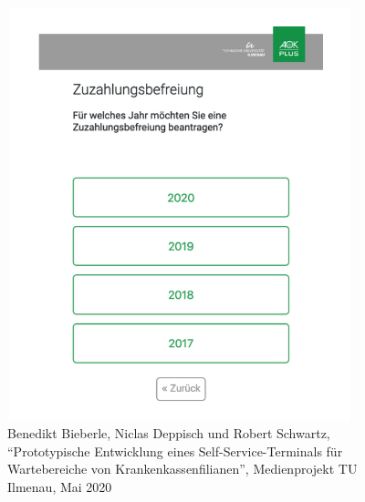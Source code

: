 \begin{figure}[htp]
    \centering
    \includegraphics[width=10cm , height=12cm]{Kapitel/Bilder/Interface.png}
    \caption{Benedikt Bieberle, Niclas Deppisch und Robert Schwartz, "`Prototypische Entwicklung eines Self-Service-Terminals für Wartebereiche von Krankenkassenfilianen"', Medienprojekt TU Ilmenau, Mai 2020}
    \label{fig:Interface}
\end{figure}



\newpage



